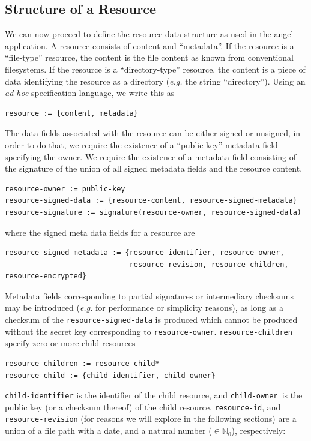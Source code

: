 \documentclass[11pt]{article}
\begin{document}
\begin{mainmatter}
\subsection{Structure of a Resource}
\label{resource-structure}
We can now proceed to define the resource data structure as used in the angel-application. A resource consists of content and ``metadata''. If the resource is a ``file-type'' resource, the content is the file content as known from conventional filesystems. If the resource is a ``directory-type'' resource, the content is a piece of data identifying the resource as a directory (\emph{e.g.} the string ``directory''). Using an \emph{ad hoc} specification language, we write this as
\begin{verbatim}
resource := {content, metadata}
\end{verbatim}
The data fields associated with the resource can be either signed or unsigned, in order to do that, we require the existence of a ``public key'' metadata field specifying the owner. We require the existence of a metadata field consisting of the signature of the union of all signed metadata fields and the resource content. 
\begin{verbatim}
resource-owner := public-key
resource-signed-data := {resource-content, resource-signed-metadata}
resource-signature := signature(resource-owner, resource-signed-data)
\end{verbatim}
where the signed meta data fields for a resource are
\begin{verbatim}
resource-signed-metadata := {resource-identifier, resource-owner, 
                             resource-revision, resource-children, resource-encrypted}
\end{verbatim} \label{revision}
Metadata fields corresponding to partial signatures or intermediary checksums may be introduced (\emph{e.g.} for performance or simplicity reasons), as long as a checksum of the \texttt{resource-signed-data} is produced which cannot be produced without the secret key corresponding to \texttt{resource-owner}.
\texttt{resource-children} specify zero or more child resources
\begin{verbatim}
resource-children := resource-child*
resource-child := {child-identifier, child-owner}
\end{verbatim}
\texttt{child-identifier} is the identifier of the child resource, and \texttt{child-owner }is the public key (or a checksum thereof) of the child resource. \texttt{resource-id}, and \texttt{resource-revision} (for reasons we will explore in the following sections) are a union of a file path with a date, and a natural number ($\in \mathbb N_0$), respectively:

\end{mainmatter}
\end{document}
